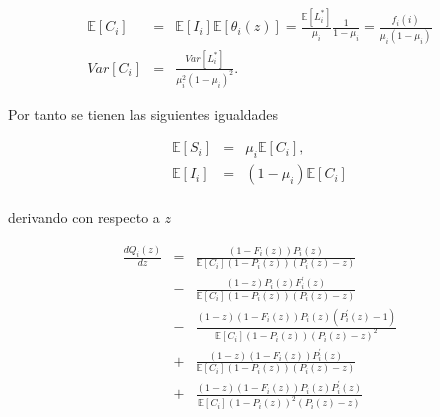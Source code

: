 \documentclass{article}
\newcommand{\esp}{\mathbb{E}}
\numberwithin{equation}{section}
\begin{document}
\begin{eqnarray*}
\esp\left[C_{i}\right]&=&\esp\left[I_{i}\right]\esp\left[\theta_{i}\left(z\right)\right]=\frac{\esp\left[L_{i}^{*}\right]}{\mu_{i}}\frac{1}{1-\mu_{i}}=\frac{f_{i}\left(i\right)}{\mu_{i}\left(1-\mu_{i}\right)}\\
Var\left[C_{i}\right]&=&\frac{Var\left[L_{i}^{*}\right]}{\mu_{i}^{2}\left(1-\mu_{i}\right)^{2}}.
\end{eqnarray*}

Por tanto se tienen las siguientes igualdades


\begin{eqnarray*}
\esp\left[S_{i}\right]&=&\mu_{i}\esp\left[C_{i}\right],\\
\esp\left[I_{i}\right]&=&\left(1-\mu_{i}\right)\esp\left[C_{i}\right]\\
\end{eqnarray*}

derivando con respecto a $z$



\begin{eqnarray*}
\frac{d Q_{i}\left(z\right)}{d z}&=&\frac{\left(1-F_{i}\left(z\right)\right)P_{i}\left(z\right)}{\esp\left[C_{i}\right]\left(1-P_{i}\left(z\right)\right)\left(P_{i}\left(z\right)-z\right)}\\
&-&\frac{\left(1-z\right)P_{i}\left(z\right)F_{i}^{'}\left(z\right)}{\esp\left[C_{i}\right]\left(1-P_{i}\left(z\right)\right)\left(P_{i}\left(z\right)-z\right)}\\
&-&\frac{\left(1-z\right)\left(1-F_{i}\left(z\right)\right)P_{i}\left(z\right)\left(P_{i}^{'}\left(z\right)-1\right)}{\esp\left[C_{i}\right]\left(1-P_{i}\left(z\right)\right)\left(P_{i}\left(z\right)-z\right)^{2}}\\
&+&\frac{\left(1-z\right)\left(1-F_{i}\left(z\right)\right)P_{i}^{'}\left(z\right)}{\esp\left[C_{i}\right]\left(1-P_{i}\left(z\right)\right)\left(P_{i}\left(z\right)-z\right)}\\
&+&\frac{\left(1-z\right)\left(1-F_{i}\left(z\right)\right)P_{i}\left(z\right)P_{i}^{'}\left(z\right)}{\esp\left[C_{i}\right]\left(1-P_{i}\left(z\right)\right)^{2}\left(P_{i}\left(z\right)-z\right)}
\end{eqnarray*}
\end{document}
